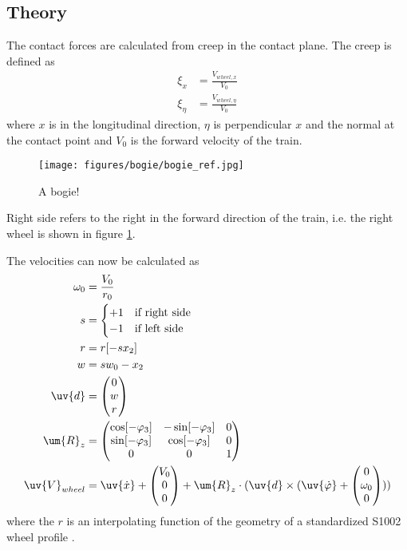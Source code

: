 
\subsection{Theory}
The contact forces are calculated from creep in the contact plane.
The creep is defined as 
\begin{align}
 \xi_x    &= \frac{V_{wheel,x}}{V_0}\\
 \xi_\eta &= \frac{V_{wheel,\eta}}{V_0}
\end{align}
where $x$ is in the longitudinal direction, $\eta$ is perpendicular $x$ and the normal at the contact point and $V_0$ is the forward velocity of the train.

\begin{figure}[htpb!]
 \centering
 \texttt{[image: figures/bogie/bogie\_ref.jpg]}
 \caption{A bogie!}
 \label{fig:wheelcontact_geom} %
\end{figure}

Right side refers to the right in the forward direction of the train, i.e. the right wheel is shown in figure \ref{fig:wheelcontact_geom}.

The velocities can now be calculated as
\begin{align}
\omega_0 &= \frac{V_0}{r_0}\\
 s       &= \begin{cases}+1&\text{if right side}\\-1&\text{if left side}\end{cases}\\
 r       &= r[-s x_2]\\
 w       &= s w_0 - x_2\\
 \uv{d}  &= \begin{pmatrix}0\\w\\r\end{pmatrix}\\
 \um{R}_z     &= \begin{pmatrix}
        \cos[-\varphi_3] & -\sin[-\varphi_3] & 0\\
        \sin[-\varphi_3] &  \cos[-\varphi_3] & 0\\
        0                &  0                & 1
     	\end{pmatrix} \\
 \uv{V}_{wheel} &= \uv{\dot{x}} +\begin{pmatrix}V_0\\0\\0\end{pmatrix} + \um{R}_z \cdot (\uv{d} \times (\uv{\dot{\varphi}}+\begin{pmatrix}0\\\omega_0\\0\end{pmatrix}))
\end{align}
where the $r$ is an interpolating function of the geometry of a standardized S1002 wheel profile \cite{railvehicledynamics_eandersson}.

